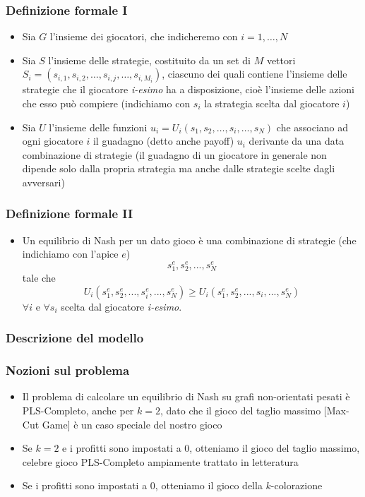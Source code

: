 \documentclass{beamer}
\begin{document}
\begin{frame}
\frametitle{Definizione formale I}
\begin{itemize}
	\item Sia $G$ l'insieme dei \alert{giocatori}, che indicheremo con $i=1,\ldots,N$
	\item Sia $S$ l'insieme delle \alert{strategie}, costituito da un set di \(M\) vettori $S_{i}=\left(s_{{i,1}},s_{{i,2}},\ldots,s_{{i,j}},\ldots,s_{{i,M_{i}}}\right)$, ciascuno dei quali contiene l'insieme delle strategie che il giocatore \textit{i-esimo} ha a disposizione, cioè l'insieme delle azioni che esso può compiere (indichiamo con $s_i$ la strategia scelta dal giocatore $i$)
	\item Sia $U$ l'insieme delle \alert{funzioni} $u_{i}=U_{i}\left(s_{1},s_{2},\ldots,s_{i},\ldots,s_{N}\right)$ che associano ad ogni giocatore $i$ il guadagno (detto anche payoff) $u_i$ derivante da una data combinazione di strategie (il guadagno di un giocatore in generale non dipende solo dalla propria strategia ma anche dalle strategie scelte dagli avversari) 
\end{itemize}
\end{frame}


\begin{frame}
\frametitle{Definizione formale II}
\begin{itemize}
	\item Un \alert{equilibrio di Nash} per un dato gioco è una combinazione di strategie (che indichiamo con l'apice $e$) \[s_{1}^{e},s_{2}^{e},...,s_{N}^{e}\] tale che \[U_{i}\left(s_{1}^{e},s_{2}^{e},...,s_{i}^{e},...,s_{N}^{e}\right)\geq U_{i}\left(s_{1}^{e},s_{2}^{e},...,s_{i},...,s_{N}^{e}\right)\] $\forall i$ e $\forall s_i$ scelta dal giocatore \textit{i-esimo}.
\end{itemize}
\end{frame}


\begin{frame}
\frametitle{Descrizione del modello}
\end{frame}


\begin{frame}
\frametitle{Nozioni sul problema}
\begin{itemize}
	\item Il problema di calcolare un equilibrio di Nash su grafi non-orientati pesati è \alert{PLS-Completo}, anche per $k=2$, dato che il gioco del taglio massimo [Max-Cut Game] è un caso speciale del nostro gioco
	\item Se $k=2$ e i profitti sono impostati a $0$, otteniamo il \alert{gioco del taglio massimo}, celebre gioco PLS-Completo ampiamente trattato in letteratura
	\item Se i profitti sono impostati a $0$, otteniamo il \alert{gioco della $k$-colorazione}
\end{itemize}
\end{frame}
\end{document}
